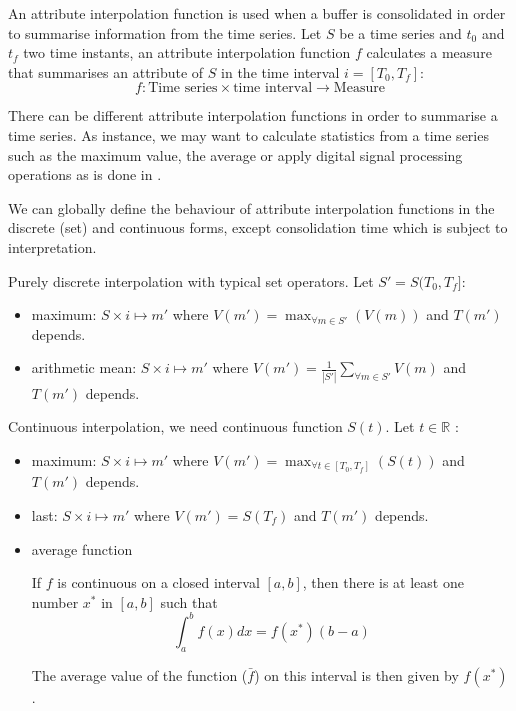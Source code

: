 {\color{red}

  An attribute interpolation function is used when a buffer is
  consolidated in order to summarise information from the time series.
  Let $S$ be a time series and $t_0$ and $t_f$ two time instants, an
  attribute interpolation function $f$ calculates a measure that
  summarises an attribute of $S$ in the time interval $i=[T_0,T_f]$:
\[
f: \text{Time series} \times \text{time interval} \longrightarrow
\text{Measure}
\]


There can be different attribute interpolation functions in order to summarise a
time series. As instance, we may want to calculate statistics from a time series such as the maximum value, the average or apply digital signal processing operations as is done in \cite{zhang11}. 


We can globally define the behaviour of attribute interpolation functions in the discrete (set) and continuous forms, except consolidation time which is subject to interpretation.

Purely discrete interpolation with typical set operators. Let $S'=S(T_0,T_f]$:

\begin{itemize}
\item maximum:  $S \times i \mapsto m'$ where $V(m') = \max_{\forall m \in S'}(V(m))$ and $T(m')$ depends.
\item arithmetic mean: $S \times i \mapsto m'$ where $V(m') = \frac{1}{|S'|} \sum\limits_{\forall m\in S'} V(m)$ and $T(m')$ depends.
\end{itemize}


Continuous interpolation, we need continuous function $S(t)$. Let $t\in\mathbb{R}$ :

\begin{itemize}

\item maximum: $S \times i \mapsto m'$ where $V(m') = \max_{\forall t \in [T_0,T_f]}(S(t))$ and $T(m')$ depends. 

\item last: $S \times i \mapsto m'$ where $V(m') = S(T_f)$ and $T(m')$ depends. 

\item average function

If $f$ is continuous on a closed interval $[a,b]$, then there is at least one number $x^*$ in $[a,b]$ such that
$$
\int_a^b f(x)dx = f(x^*)(b-a)
$$

The average value of the function ($\bar f$)  on this interval is then given by  $f(x^*)$.


\end{itemize}}
